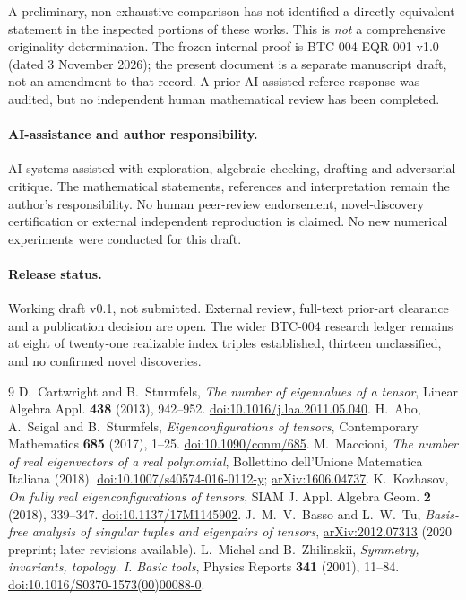 \documentclass[10pt,a4paper]{article}
\theoremstyle{plain}
\theoremstyle{remark}
\begin{document}
A preliminary, non-exhaustive comparison has not identified a directly equivalent statement in the inspected portions of these works. This is \emph{not} a comprehensive originality determination. The frozen internal proof is BTC-004-EQR-001 v1.0 (dated 3 November 2026); the present document is a separate manuscript draft, not an amendment to that record. A prior AI-assisted referee response was audited, but no independent human mathematical review has been completed.

\paragraph{AI-assistance and author responsibility.} AI systems assisted with exploration, algebraic checking, drafting and adversarial critique. The mathematical statements, references and interpretation remain the author's responsibility. No human peer-review endorsement, novel-discovery certification or external independent reproduction is claimed. No new numerical experiments were conducted for this draft.

\paragraph{Release status.} Working draft v0.1, not submitted. External review, full-text prior-art clearance and a publication decision are open. The wider BTC-004 research ledger remains at eight of twenty-one realizable index triples established, thirteen unclassified, and no confirmed novel discoveries.

\begin{thebibliography}{9}\setlength{\itemsep}{2pt}
 D.~Cartwright and B.~Sturmfels, \emph{The number of eigenvalues of a tensor}, Linear Algebra Appl. \textbf{438} (2013), 942--952. \href{https://doi.org/10.1016/j.laa.2011.05.040}{doi:10.1016/j.laa.2011.05.040}.
 H.~Abo, A.~Seigal and B.~Sturmfels, \emph{Eigenconfigurations of tensors}, Contemporary Mathematics \textbf{685} (2017), 1--25. \href{https://doi.org/10.1090/conm/685}{doi:10.1090/conm/685}.
 M.~Maccioni, \emph{The number of real eigenvectors of a real polynomial}, Bollettino dell'Unione Matematica Italiana (2018). \href{https://doi.org/10.1007/s40574-016-0112-y}{doi:10.1007/s40574-016-0112-y}; \href{https://arxiv.org/abs/1606.04737}{arXiv:1606.04737}.
 K.~Kozhasov, \emph{On fully real eigenconfigurations of tensors}, SIAM J. Appl. Algebra Geom. \textbf{2} (2018), 339--347. \href{https://doi.org/10.1137/17M1145902}{doi:10.1137/17M1145902}.
 J.~M.~V.~Basso and L.~W.~Tu, \emph{Basis-free analysis of singular tuples and eigenpairs of tensors}, \href{https://arxiv.org/abs/2012.07313}{arXiv:2012.07313} (2020 preprint; later revisions available).
 L.~Michel and B.~Zhilinskii, \emph{Symmetry, invariants, topology. I. Basic tools}, Physics Reports \textbf{341} (2001), 11--84. \href{https://doi.org/10.1016/S0370-1573(00)00088-0}{doi:10.1016/S0370-1573(00)00088-0}.
\end{thebibliography}
\end{document}
